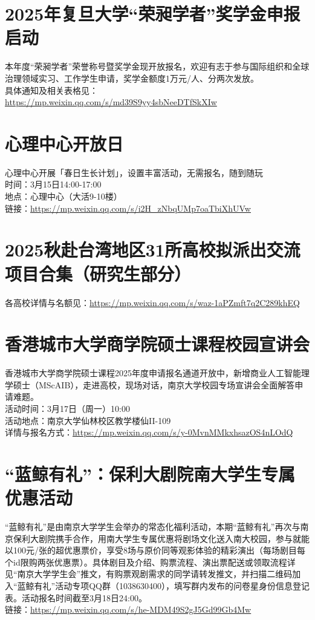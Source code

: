 \documentclass[letterpaper, 12pt]{article}
\begin{document}
\begin{multicols}{2}
\section{2025年复旦大学“荣昶学者”奖学金申报启动}
本年度“荣昶学者”荣誉称号暨奖学金现开放报名，欢迎有志于参与国际组织和全球治理领域实习、工作学生申请，奖学金额度1万元/人、分两次发放。\\
具体通知及相关表格见：\url{https://mp.weixin.qq.com/s/md39S9yy4sbNeeDTfSkXIw}

\section{心理中心开放日}
心理中心开展「春日生长计划」，设置丰富活动，无需报名，随到随玩\\
时间：3月15日14:00-17:00\\
地点：心理中心（大活9-10楼）\\
链接：\url{https://mp.weixin.qq.com/s/i2H_zNbqUMp7oaTbiXhUVw}\\

\section{2025秋赴台湾地区31所高校拟派出交流项目合集（研究生部分）}
各高校详情与名额见：\url{https://mp.weixin.qq.com/s/waz-1aPZmft7q2C289khEQ}

\section{香港城市大学商学院硕士课程校园宣讲会}
香港城市大学商学院硕士课程2025年度申请报名通道开放中，新增商业人工智能理学硕士（MScAIB），走进高校，现场对话，南京大学校园专场宣讲会全面解答申请难题。\\
活动时间：3月17日（周一）10:00\\
活动地点：南京大学仙林校区教学楼仙II-109\\
详情与报名方式：\url{https://mp.weixin.qq.com/s/y-0MvnMMkxhsazOS4nLOdQ}


\section{“蓝鲸有礼”：保利大剧院南大学生专属优惠活动}
“蓝鲸有礼”是由南京大学学生会举办的常态化福利活动，本期“蓝鲸有礼”再次与南京保利大剧院携手合作，用南大学生专属优惠将剧场文化送入南大校园，参与就能以100元/张的超优惠票价，享受8场与原价同等观影体验的精彩演出（每场剧目每个id限购两张优惠票）。具体剧目及介绍、购票流程、演出票配送或领取流程详见“南京大学学生会”推文，有购票观剧需求的同学请转发推文，并扫描二维码加入“蓝鲸有礼”活动专项QQ群（1038630400），填写群内发布的问卷星身份信息登记表。活动报名时间截至3月18日24:00。\\
链接：\url{https://mp.weixin.qq.com/s/he-MDM49S2gJ5Gd99Gb4Mw}


\end{multicols}
\end{document}
